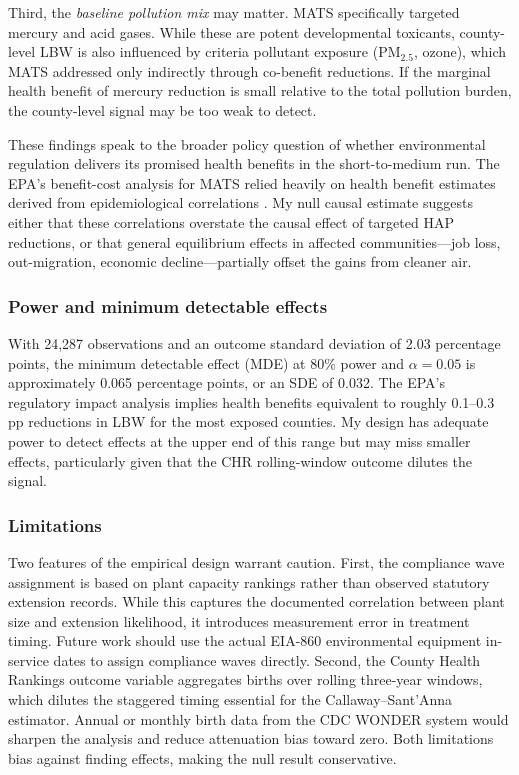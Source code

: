 \documentclass[12pt]{article}
\begin{document}
Third, the \textit{baseline pollution mix} may matter. MATS specifically targeted mercury and acid gases. While these are potent developmental toxicants, county-level LBW is also influenced by criteria pollutant exposure (PM$_{2.5}$, ozone), which MATS addressed only indirectly through co-benefit reductions. If the marginal health benefit of mercury reduction is small relative to the total pollution burden, the county-level signal may be too weak to detect.

These findings speak to the broader policy question of whether environmental regulation delivers its promised health benefits in the short-to-medium run. The EPA's benefit-cost analysis for MATS relied heavily on health benefit estimates derived from epidemiological correlations \citep{epa2011ria}. My null causal estimate suggests either that these correlations overstate the causal effect of targeted HAP reductions, or that general equilibrium effects in affected communities---job loss, out-migration, economic decline---partially offset the gains from cleaner air.

\subsubsection*{Power and minimum detectable effects} With 24,287 observations and an outcome standard deviation of 2.03 percentage points, the minimum detectable effect (MDE) at 80\% power and $\alpha = 0.05$ is approximately 0.065 percentage points, or an SDE of 0.032. The EPA's regulatory impact analysis implies health benefits equivalent to roughly 0.1--0.3 pp reductions in LBW for the most exposed counties. My design has adequate power to detect effects at the upper end of this range but may miss smaller effects, particularly given that the CHR rolling-window outcome dilutes the signal.

\subsubsection*{Limitations} Two features of the empirical design warrant caution. First, the compliance wave assignment is based on plant capacity rankings rather than observed statutory extension records. While this captures the documented correlation between plant size and extension likelihood, it introduces measurement error in treatment timing. Future work should use the actual EIA-860 environmental equipment in-service dates to assign compliance waves directly. Second, the County Health Rankings outcome variable aggregates births over rolling three-year windows, which dilutes the staggered timing essential for the Callaway--Sant'Anna estimator. Annual or monthly birth data from the CDC WONDER system would sharpen the analysis and reduce attenuation bias toward zero. Both limitations bias against finding effects, making the null result conservative.
\end{document}
